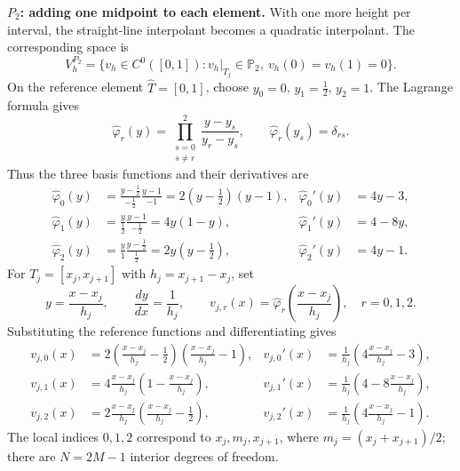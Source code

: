 \documentclass[11pt,a4paper]{article}
\begin{document}
\textbf{$P_2$: adding one midpoint to each element.}
With one more height per interval, the straight-line interpolant becomes a quadratic interpolant. The corresponding space is
\[
 V_h^{P_2}=\{v_h\in C^0([0,1]):v_h|_{T_j}\in\mathbb P_2,
 \ v_h(0)=v_h(1)=0\}.
\]
On the reference element $\widehat T=[0,1]$, choose
$y_0=0$, $y_1=\tfrac12$, $y_2=1$. The Lagrange formula gives
\[
 \widehat\varphi_r(y)=\prod_{\substack{s=0\\s\neq r}}^2
 \frac{y-y_s}{y_r-y_s},\qquad
 \widehat\varphi_r(y_s)=\delta_{rs}.
\]
Thus the three basis functions and their derivatives are
\[
 \begin{aligned}
 \widehat\varphi_0(y)
 &=\frac{y-\tfrac12}{-\tfrac12}\frac{y-1}{-1}
 =2(y-\tfrac12)(y-1),
 &\widehat\varphi_0'(y)&=4y-3,\\[4pt]
 \widehat\varphi_1(y)
 &=\frac{y}{\tfrac12}\frac{y-1}{-\tfrac12}
 =4y(1-y),
 &\widehat\varphi_1'(y)&=4-8y,\\[4pt]
 \widehat\varphi_2(y)
 &=\frac{y}{1}\frac{y-\tfrac12}{\tfrac12}
 =2y(y-\tfrac12),
 &\widehat\varphi_2'(y)&=4y-1.
 \end{aligned}
\]
For $T_j=[x_j,x_{j+1}]$ with $h_j=x_{j+1}-x_j$, set
\[
 y=\frac{x-x_j}{h_j},\qquad \frac{dy}{dx}=\frac1{h_j},\qquad
 v_{j,r}(x)=\widehat\varphi_r\!\left(\frac{x-x_j}{h_j}\right),
 \quad r=0,1,2.
\]
Substituting the reference functions and differentiating gives
\[
\begin{aligned}
 v_{j,0}(x)&=2\left(\frac{x-x_j}{h_j}-\frac12\right)
                  \left(\frac{x-x_j}{h_j}-1\right),
 &v_{j,0}'(x)&=\frac1{h_j}\left(4\frac{x-x_j}{h_j}-3\right),\\[8pt]
 v_{j,1}(x)&=4\frac{x-x_j}{h_j}\left(1-\frac{x-x_j}{h_j}\right),
 &v_{j,1}'(x)&=\frac1{h_j}\left(4-8\frac{x-x_j}{h_j}\right),\\[8pt]
 v_{j,2}(x)&=2\frac{x-x_j}{h_j}\left(\frac{x-x_j}{h_j}-\frac12\right),
 &v_{j,2}'(x)&=\frac1{h_j}\left(4\frac{x-x_j}{h_j}-1\right).
\end{aligned}
\]
The local indices $0,1,2$ correspond to $x_j,m_j,x_{j+1}$, where
$m_j=(x_j+x_{j+1})/2$; there are $N=2M-1$ interior degrees of freedom.
\end{document}
